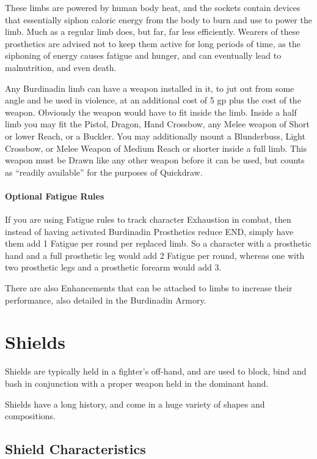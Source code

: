 \documentclass[oneside,11pt,english]{book}
\begin{document}
These limbs are powered by human body heat, and the sockets contain devices that essentially siphon caloric energy from the body to burn and use to power the limb. Much as a regular limb does, but far, far less efficiently. Wearers of these prosthetics are advised not to keep them active for long periods of time, 
as the siphoning of energy causes fatigue and hunger, and can eventually lead to malnutrition, and even death. 

Any Burdinadin limb can have a weapon installed in it, to jut out from some angle and be used in 
violence, at an additional cost of 5 gp plus the cost of the weapon. Obviously the weapon would have to 
fit inside the limb. Inside a half limb you may fit the Pistol, Dragon, Hand Crossbow, any Melee weapon 
of Short or lower Reach, or a Buckler. You may additionally mount a Blunderbuss, Light Crossbow, or 
Melee Weapon of Medium Reach or shorter inside a full limb. This weapon must be Drawn like any other 
weapon before it can be used, but counts as “readily available” for the purposes of Quickdraw. 

\subsubsection{Optional Fatigue Rules}
If you are using Fatigue rules to track character Exhaustion in combat, then instead of having activated 
Burdinadin Prosthetics reduce END, simply have them add 1 Fatigue per round per replaced limb. So a 
character with a prosthetic hand and a full prosthetic leg would add 2 Fatigue per round, whereas one with 
two prosthetic legs and a prosthetic forearm would add 3. 

There are also Enhancements that can be attached to limbs to increase their performance, also detailed in 
the Burdinadin Armory. 
\chapter{Shields}\label{ch:Shields}
\startcontents[chapters]
\newpage
Shields are typically held in a fighter’s off-hand, and are used to block, bind and bash in conjunction with 
a proper weapon held in the dominant hand. 

Shields have a long history, and come in a huge variety of shapes and compositions.

\section{Shield Characteristics}
\end{document}
